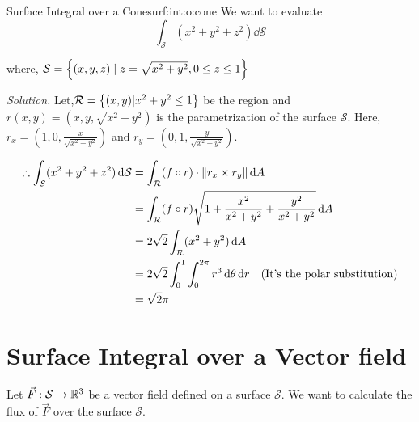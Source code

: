 \documentclass[../Analysis-3.tex]{subfiles}
\begin{document}
\begin{Eg}{Surface Integral over a Cone}{surf:int:o:cone}
  We want to evaluate \[ \int_{\mathcal{S}}(x^2+y^2+z^2) \dd \mathcal{S}\]

  where, $\mathcal{S} = \qty{(x,y,z) \mid z = \sqrt{x^2 + y^2},0 \le z \le 1}$

  \textit{Solution.} Let,$\mathcal{R} = \qty{(x,y)| x^2+y^2 \le 1}$ be the region and $r(x,y) = \left( x,y,\sqrt{x^2+y^2} \right)$ is the parametrization of the surface $\mathcal{S}$. Here, $r_x = \left( 1,0, \frac{x}{\sqrt{x^2+y^2}} \right)$ and $r_y = \left( 0,1,\frac{y}{\sqrt{x^2+y^2}} \right)$.


  \begin{align*}
    \therefore \int_{\mathcal{S}}(x^2+y^2+z^2) \, \dd \mathcal{S}
     & = \int_{\mathcal{R}} (f\circ r) \cdot \norm{r_x \times r_y} \, \dd A                                           \\
     & = \int_{\mathcal{R}} (f\circ r) \sqrt{1 + \frac{x^2}{x^2+y^2} + \frac{y^2}{x^2+y^2}} \, \dd A                  \\
     & = 2\sqrt{2} \int_{\mathcal{R}} (x^2+y^2) \, \dd A                                                              \\
     & = 2\sqrt{2} \int_{0}^{1} \int_{0}^{2\pi} r^3 \, \dd \theta \, \dd r \quad (\text{It's the polar substitution}) \\
     & = \sqrt{2} \pi
  \end{align*}

\end{Eg}

\section{Surface Integral over a Vector field}

Let $\vec{F} : \mathcal{S} \to \mathbb{R}^3$ be a vector field defined on a surface $\mathcal{S}$. We want to calculate the flux of $\vec{F}$ over the surface $\mathcal{S}$.
\end{document}
